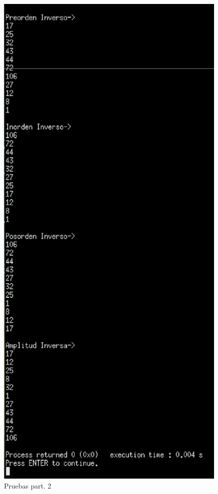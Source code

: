 \documentclass[a4paper,12pt]{article}
\begin{document}
    \begin{figure}[h]
      \centering
      \includegraphics[scale = 0.6]{2.eps}
      \caption{Pruebas part. 2}
    \end{figure}
\end{document}

